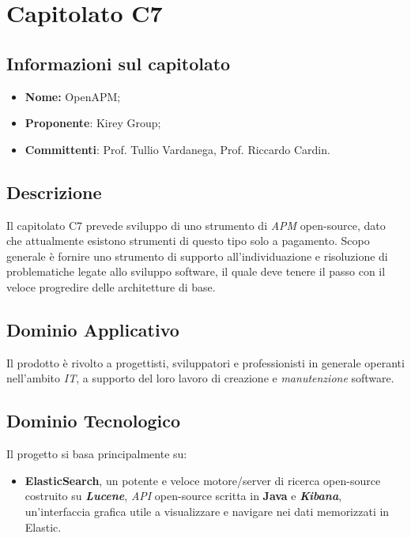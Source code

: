 \section{Capitolato C7}
\subsection{Informazioni sul capitolato}
	\begin{itemize}
		\item \textbf{Nome:}
		OpenAPM;
		\item \textbf{Proponente}:
		Kirey Group;
		\item \textbf{Committenti}:
		Prof. Tullio Vardanega, Prof. Riccardo Cardin.
	\end{itemize}

\subsection{Descrizione}
	Il capitolato C7 prevede sviluppo di uno strumento di \textit{APM} open-source, dato che attualmente esistono strumenti di questo tipo solo a pagamento. Scopo generale è fornire uno strumento di supporto all'individuazione e risoluzione di problematiche legate allo sviluppo software, il quale deve tenere il passo con il veloce progredire delle architetture di base.
		
\subsection{Dominio Applicativo}
	Il prodotto è rivolto a progettisti, sviluppatori e professionisti in generale operanti nell'ambito \textit{IT}, a supporto del loro lavoro di creazione e \textit{manutenzione} software. 

\subsection{Dominio Tecnologico}
	Il progetto si basa principalmente su:
		\begin{itemize}
			\item \textbf{ElasticSearch}, un potente e veloce motore/server di ricerca open-source costruito su \textit{\textbf{Lucene}}, \textit{API} open-source scritta in \textbf{Java}  e \textit{\textbf{Kibana}}, un'interfaccia grafica utile a visualizzare e navigare nei dati memorizzati in Elastic.
		\end{itemize}

